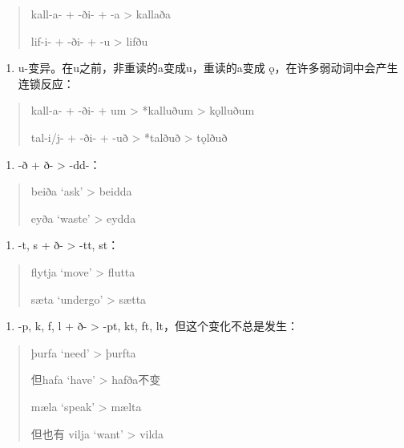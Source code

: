 \begin{quote}
  kall-a- + -ði- + -a \textgreater{} kallaða

  lif-i- + -ði- + -u \textgreater{} lifðu
\end{quote}

\begin{enumerate}
  \def\labelenumi{\arabic{enumi})}
  \setcounter{enumi}{1}
  \item
        u-变异。在u之前，非重读的a变成u，重读的a变成
        ǫ，在许多弱动词中会产生连锁反应：
\end{enumerate}

\begin{quote}
  kall-a- + -ði- + um \textgreater{} *kalluðum \textgreater{} kǫlluðum

  tal-i/j- + -ði- + -uð \textgreater{} *talðuð \textgreater{} tǫlðuð
\end{quote}

\begin{enumerate}
  \def\labelenumi{\arabic{enumi})}
  \setcounter{enumi}{2}
  \item
        -ð + ð- \textgreater{} -dd-：
\end{enumerate}

\begin{quote}
  beiða `ask' \textgreater{} beidda

  eyða `waste' \textgreater{} eydda
\end{quote}

\begin{enumerate}
  \def\labelenumi{\arabic{enumi})}
  \setcounter{enumi}{3}
  \item
        -t, s + ð- \textgreater{} -tt, st：
\end{enumerate}

\begin{quote}
  flytja `move‌' \textgreater{} flutta

  sæta `undergo‌' \textgreater{} sætta
\end{quote}

\begin{enumerate}
  \def\labelenumi{\arabic{enumi})}
  \setcounter{enumi}{4}
  \item
        -p, k, f, l + ð- \textgreater{} -pt, kt, ft,
        lt，但这个变化不总是发生：
\end{enumerate}

\begin{quote}
  þurfa `need‌' \textgreater{} þurfta

  但hafa `have‌' \textgreater{} hafða不变

  mæla `speak‌' \textgreater{} mælta

  但也有 vilja `want‌' \textgreater{} vilda
\end{quote}

